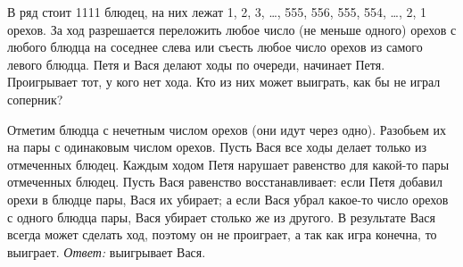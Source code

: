 \problem{}
В ряд стоит 1111 блюдец, на них лежат
1, 2, 3, \ldots, 555, 556, 555, 554, \ldots, 2, 1 орехов.
За ход разрешается переложить любое число (не меньше одного) орехов с любого
блюдца на соседнее слева или съесть любое число орехов из самого левого блюдца.
Петя и Вася делают ходы по очереди, начинает Петя.
Проигрывает тот, у кого нет хода.
Кто из них может выиграть, как бы не играл соперник?

\solution
Отметим блюдца с нечетным числом орехов (они идут через одно).
Разобьем их на пары с одинаковым числом орехов.
Пусть Вася все ходы делает только из отмеченных блюдец.
Каждым ходом Петя нарушает равенство для какой-то пары отмеченных блюдец.
Пусть Вася равенство восстанавливает:
если Петя добавил орехи в блюдце пары, Вася их убирает;
а если Вася убрал какое-то число орехов с одного блюдца пары, Вася убирает
столько же из другого.
В результате Вася всегда может сделать ход, поэтому он не проиграет,
а так как игра конечна, то выиграет.
\emph{Ответ:} выигрывает Вася.

\endproblem
